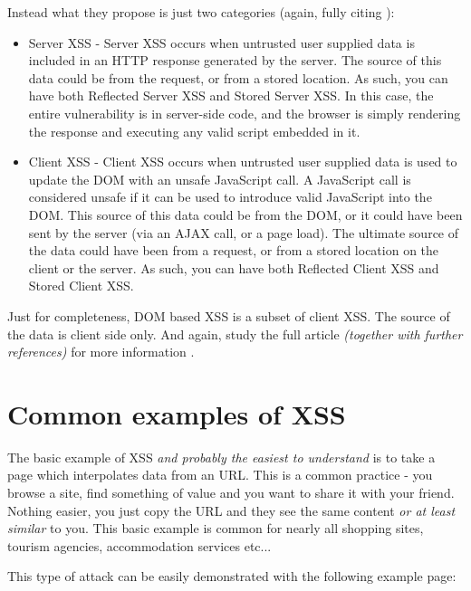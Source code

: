 Instead what they propose is just two categories (again, fully citing \cite{xss_owasp_types}):

\begin{itemize}
  \item  Server XSS - Server XSS occurs when untrusted user supplied data is included in an HTTP
        response generated by the server. The source of this data could be from the request, or from
        a stored location. As such, you can have both Reflected Server XSS and Stored Server XSS. In
        this case, the entire vulnerability is in server-side code, and the browser is simply
        rendering the response and executing any valid script embedded in it.
  \item  Client XSS - Client XSS occurs when untrusted user supplied data is used to update the DOM
        with an unsafe JavaScript call. A JavaScript call is considered unsafe if it can be used to
        introduce valid JavaScript into the DOM. This source of this data could be from the DOM, or
        it could have been sent by the server (via an AJAX call, or a page load). The ultimate
        source of the data could have been from a request, or from a stored location on the client
        or the server. As such, you can have both Reflected Client XSS and Stored Client XSS.
\end{itemize}

Just for completeness, DOM based XSS is a subset of client XSS. The source of the data is client
side only. And again, study the full article \emph{(together with further references)} for more
information \cite{xss_owasp_types}.

\section{Common examples of XSS}

The basic example of XSS \emph{and probably the easiest to understand} is to take a page which
interpolates data from an URL. This is a common practice - you browse a site, find something of
value and you want to share it with your friend. Nothing easier, you just copy the URL and they see
the same content \emph{or at least similar} to you. This basic example is common for nearly all
shopping sites, tourism agencies, accommodation services etc...

This type of attack can be easily demonstrated with the following example page:
\bigskip

